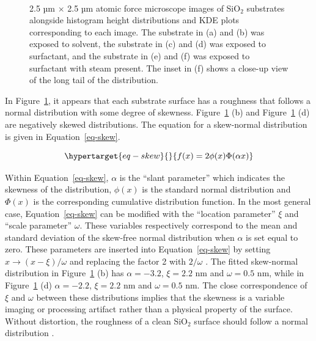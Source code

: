 \documentclass[
  a4paper,
]{scrbook}
\begin{document}
\begin{figure}
\begin{minipage}[t]{0.45\linewidth}
{{}

}

\end{minipage}%
%
\begin{minipage}[t]{0.01\linewidth}

{\centering 

~

}

\end{minipage}%

\caption[Atomic force microscope images of SiO\(_2\) substrates
alongside histogram height distributions and KDE plots corresponding to
each image.]{\label{fig-afm-substrate}2.5 µm \(\times\) 2.5 µm atomic
force microscope images of SiO\(_2\) substrates alongside histogram
height distributions and KDE plots corresponding to each image. The
substrate in (a) and (b) was exposed to solvent, the substrate in (c)
and (d) was exposed to surfactant, and the substrate in (e) and (f) was
exposed to surfactant with steam present. The inset in (f) shows a
close-up view of the long tail of the distribution.}

\end{figure}

In Figure~\ref{fig-afm-substrate}, it appears that each substrate
surface has a roughness that follows a normal distribution with some
degree of skewness. Figure~\ref{fig-afm-substrate} (b) and
Figure~\ref{fig-afm-substrate} (d) are negatively skewed distributions.
The equation for a skew-normal distribution is given in
Equation~\ref{eq-skew}.

\begin{equation}\protect\hypertarget{eq-skew}{}{
f(x) = 2\phi(x)\Phi(\alpha x)
}\label{eq-skew}\end{equation}

Within Equation~\ref{eq-skew}, \(\alpha\) is the ``slant parameter''
which indicates the skewness of the distribution, \(\phi(x)\) is the
standard normal distribution and \(\Phi(x)\) is the corresponding
cumulative distribution function. In the most general case,
Equation~\ref{eq-skew} can be modified with the ``location parameter''
\(\xi\) and ``scale parameter'' \(\omega\). These variables respectively
correspond to the mean and standard deviation of the skew-free normal
distribution when \(\alpha\) is set equal to zero. These parameters are
inserted into Equation~\ref{eq-skew} by setting
\(x \rightarrow (x-\xi)/\omega\) and replacing the factor 2 with
\(2/\omega\) \autocite{Azzalini2013}. The fitted skew-normal
distribution in Figure~\ref{fig-afm-substrate} (b) has
\(\alpha = -3.2\), \(\xi = 2.2\) nm and \(\omega = 0.5\) nm, while in
Figure~\ref{fig-afm-substrate} (d) \(\alpha = -2.2\), \(\xi = 2.2\) nm
and \(\omega = 0.5\) nm. The close correspondence of \(\xi\) and
\(\omega\) between these distributions implies that the skewness is a
variable imaging or processing artifact rather than a physical property
of the surface. Without distortion, the roughness of a clean SiO\(_2\)
surface should follow a normal distribution \autocite{Velicky2015}.
\end{document}
